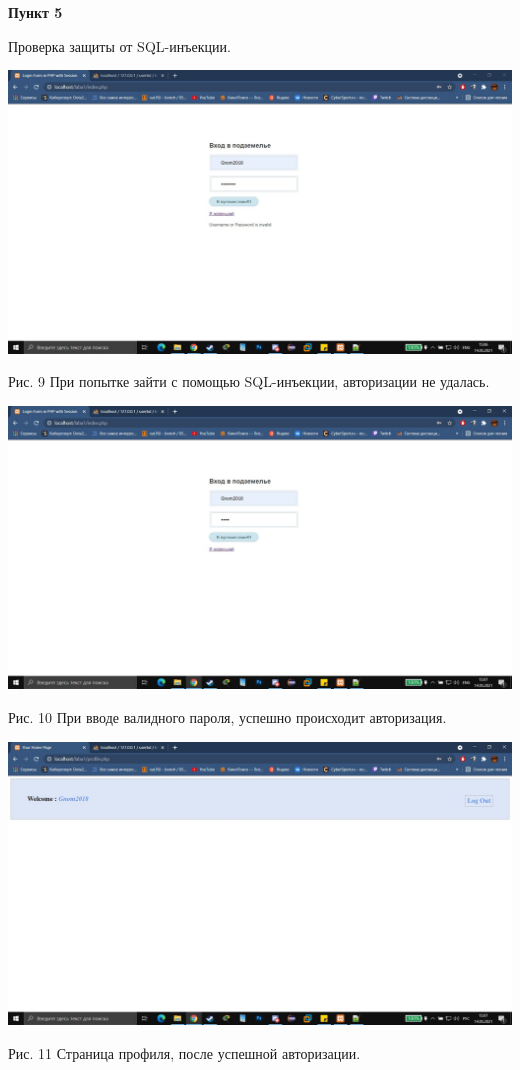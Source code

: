 \documentclass[a4paper,14pt]{extarticle}
\begin{document}
    \newpage
    \textbf{Пункт 5}
    \vspace{-3ex}
    \begin{center}
        \singlespacing
        Проверка защиты от SQL-инъекции.

        \includegraphics[scale=0.25]{pics/9.jpg}

        Рис. 9 При попытке зайти с помощью SQL-инъекции, авторизации не удалась. 
        \vspace{1ex}

        \includegraphics[scale=0.25]{pics/10.jpg}

        Рис. 10 При вводе валидного пароля, успешно происходит авторизация.

        \includegraphics[scale=0.25]{pics/11.jpg}

        Рис. 11 Страница профиля, после успешной авторизации.
    \end{center}
\end{document}
